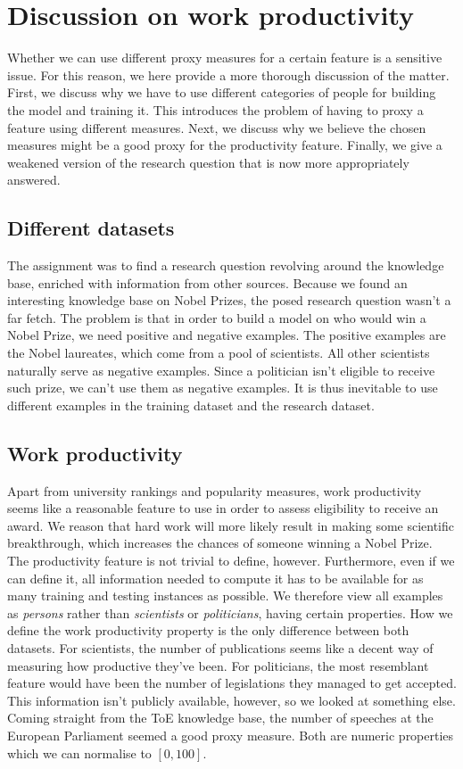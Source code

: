 \section{Discussion on work productivity}
\label{sec:productivity}

Whether we can use different proxy measures for a certain feature is a sensitive issue. For this reason, we here provide a more thorough discussion of the matter. First, we discuss why we have to use different categories of people for building the model and training it. This introduces the problem of having to proxy a feature using  different measures. Next, we discuss why we believe the chosen measures might be a good proxy for the productivity feature. Finally, we give a weakened version of the research question that is now more appropriately answered.

\subsection{Different datasets}

The assignment was to find a research question revolving around the knowledge base, enriched with information from other sources. Because we found an interesting knowledge base on Nobel Prizes, the posed research question wasn't a far fetch. The problem is that in order to build a model on who would win a Nobel Prize, we need positive and negative examples. The positive examples are the Nobel laureates, which come from a pool of scientists. All other scientists naturally serve as negative examples. Since a politician isn't eligible to receive such prize, we can't use them as negative examples. It is thus inevitable to use different examples in the training dataset and the research dataset.

\subsection{Work productivity}

Apart from university rankings and popularity measures, work productivity seems like a reasonable feature to use in order to assess eligibility to receive an award. We reason that hard work will more likely result in making some scientific breakthrough, which increases the chances of someone winning a Nobel Prize. The productivity feature is not trivial to define, however. Furthermore, even if we can define it, all information needed to compute it has to be available for as many training and testing instances as possible. We therefore view all examples as \emph{persons} rather than \emph{scientists} or \emph{politicians}, having certain properties. How we define the work productivity property is the only difference between both datasets. For scientists, the number of publications seems like a decent way of measuring how productive they've been. For politicians, the most resemblant feature would have been the number of legislations they managed to get accepted. This information isn't publicly available, however, so we looked at something else. Coming straight from the ToE knowledge base, the number of speeches at the European Parliament seemed a good proxy measure. Both are numeric properties which we can normalise to $[0, 100]$.

